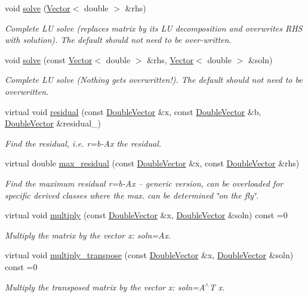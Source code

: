 \begin{DoxyCompactItemize}
void \hyperlink{classoomph_1_1DoubleMatrixBase_ae9098f3e129833a6b1cb5fe6ebdd9835}{solve} (\hyperlink{classoomph_1_1Vector}{Vector}$<$ double $>$ \&rhs)
\begin{DoxyCompactList}\small\item\em Complete LU solve (replaces matrix by its LU decomposition and overwrites R\+HS with solution). The default should not need to be over-\/written. \end{DoxyCompactList}\item 
void \hyperlink{classoomph_1_1DoubleMatrixBase_a8d9fb5fddec05a0b6e35cff23c79255c}{solve} (const \hyperlink{classoomph_1_1Vector}{Vector}$<$ double $>$ \&rhs, \hyperlink{classoomph_1_1Vector}{Vector}$<$ double $>$ \&soln)
\begin{DoxyCompactList}\small\item\em Complete LU solve (Nothing gets overwritten!). The default should not need to be overwritten. \end{DoxyCompactList}\item 
virtual void \hyperlink{classoomph_1_1DoubleMatrixBase_a971bdc2d9297fc582af8467178f4e00e}{residual} (const \hyperlink{classoomph_1_1DoubleVector}{Double\+Vector} \&x, const \hyperlink{classoomph_1_1DoubleVector}{Double\+Vector} \&b, \hyperlink{classoomph_1_1DoubleVector}{Double\+Vector} \&residual\+\_\+)
\begin{DoxyCompactList}\small\item\em Find the residual, i.\+e. r=b-\/\+Ax the residual. \end{DoxyCompactList}\item 
virtual double \hyperlink{classoomph_1_1DoubleMatrixBase_a69a001b704e1d67277170ff7c0e4f6af}{max\+\_\+residual} (const \hyperlink{classoomph_1_1DoubleVector}{Double\+Vector} \&x, const \hyperlink{classoomph_1_1DoubleVector}{Double\+Vector} \&rhs)
\begin{DoxyCompactList}\small\item\em Find the maximum residual r=b-\/\+Ax -- generic version, can be overloaded for specific derived classes where the max. can be determined \char`\"{}on the fly\char`\"{}. \end{DoxyCompactList}\item 
virtual void \hyperlink{classoomph_1_1DoubleMatrixBase_a78204eab557e0dc99618e41a28a5c092}{multiply} (const \hyperlink{classoomph_1_1DoubleVector}{Double\+Vector} \&x, \hyperlink{classoomph_1_1DoubleVector}{Double\+Vector} \&soln) const =0
\begin{DoxyCompactList}\small\item\em Multiply the matrix by the vector x\+: soln=Ax. \end{DoxyCompactList}\item 
virtual void \hyperlink{classoomph_1_1DoubleMatrixBase_a843d44405b70da1d96b43218a21e6ffc}{multiply\+\_\+transpose} (const \hyperlink{classoomph_1_1DoubleVector}{Double\+Vector} \&x, \hyperlink{classoomph_1_1DoubleVector}{Double\+Vector} \&soln) const =0
\begin{DoxyCompactList}\small\item\em Multiply the transposed matrix by the vector x\+: soln=A$^\wedge$T x. \end{DoxyCompactList}\end{DoxyCompactItemize}
